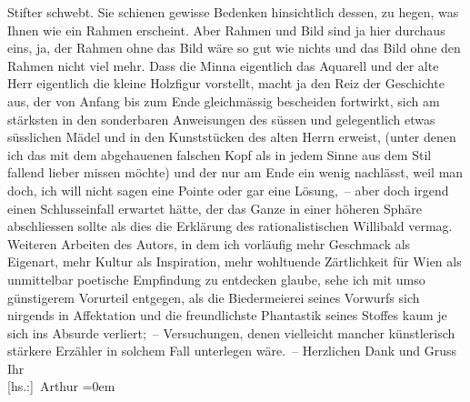 \begin{ledgroupsized}[t]{13cm}
                        Stifter schwebt. Sie schienen gewisse
                    Bedenken hinsichtlich dessen, zu hegen, was Ihnen wie ein Rahmen erscheint. Aber
                    Rahmen und Bild sind ja hier durchaus eins, ja, der Rahmen ohne das Bild wäre so
                    gut wie nichts und das Bild ohne den Rahmen nicht viel mehr. Dass die Minna eigentlich das
                    Aquarell und der alte Herr eigentlich die kleine Holzfigur vorstellt, macht ja
                    den Reiz der Geschichte aus, der von Anfang bis zum Ende gleichmässig bescheiden
                    fortwirkt, sich am stärksten in den sonderbaren Anweisungen des süssen und
                    gelegentlich etwas süsslichen Mädel und in den Kunststücken des alten {\pb}Herrn erweist, (unter denen ich das mit dem
                    abgehauenen falschen Kopf als in jedem Sinne aus dem Stil fallend lieber missen
                    möchte) und der nur am Ende ein wenig nachlässt, weil man doch, ich will nicht
                    sagen eine Pointe oder gar eine Lösung, – aber doch irgend einen Schlusseinfall
                    erwartet hätte, der das Ganze in einer höheren Sphäre abschliessen sollte als
                    dies die Erklärung des rationalistischen Willibald vermag. Weiteren Arbeiten des Autors, in dem ich
                    vorläufig mehr Geschmack als Eigenart, mehr Kultur als Inspiration, mehr
                    wohltuende Zärtlichkeit für Wien als unmittelbar
                    poetische Empfindung zu entdecken glaube, sehe ich mit umso günstigerem
                    Vorurteil entgegen, als die Biedermeierei seines Vorwurfs \introOben{}sich\introOben{} nirgends in Affektation und die freundlichste Phantastik seines
                    Stoffes kaum je sich ins Absurde verliert; – Versuchungen, denen vielleicht
                    mancher künstlerisch stärkere Erzähler in solchem Fall unterlegen wäre. –
                    Herzlichen Dank und Gruss\pend
           \pstart
           Ihr{\\[\baselineskip]}\spacefill\mbox{{[}hs.:{]} Arthur}\pend
           \leftskip=0em{}
         
         \endnumbering{}\end{ledgroupsized}  \newcommand{\dateiname}{L02238}\newcommand{\titel}{Arthur Schnitzler an Hugo von Hofmannsthal, 22. 8. 1916}\newcommand{\editorInnen}{Martin Anton Müller und Gerd-Hermann Susen}
      